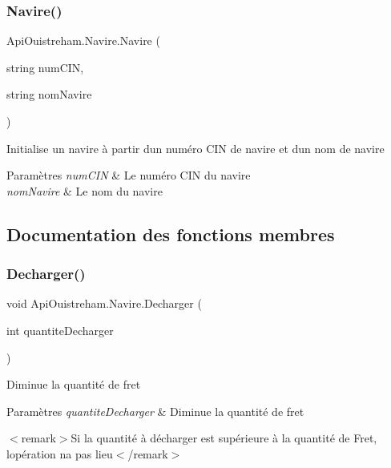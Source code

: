 \subsubsection{\texorpdfstring{Navire()}{Navire()}}
{\footnotesize\ttfamily Api\+Ouistreham.\+Navire.\+Navire (\begin{DoxyParamCaption}\item[{string}]{num\+C\+IN,  }\item[{string}]{nom\+Navire }\end{DoxyParamCaption})}



Initialise un navire à partir d\textquotesingle{}un numéro C\+IN de navire et d\textquotesingle{}un nom de navire 


\begin{DoxyParams}{Paramètres}
{\em num\+C\+IN} & Le numéro C\+IN du navire\\
\hline
{\em nom\+Navire} & Le nom du navire\\
\hline
\end{DoxyParams}


\subsection{Documentation des fonctions membres}
\mbox{\label{class_api_ouistreham_1_1_navire_ab9e8ee30d5c11742d5127c3af6acdba2}} 
\subsubsection{\texorpdfstring{Decharger()}{Decharger()}}
{\footnotesize\ttfamily void Api\+Ouistreham.\+Navire.\+Decharger (\begin{DoxyParamCaption}\item[{int}]{quantite\+Decharger }\end{DoxyParamCaption})}



Diminue la quantité de fret 


\begin{DoxyParams}{Paramètres}
{\em quantite\+Decharger} & Diminue la quantité de fret\\
\hline
\end{DoxyParams}
$<$remark$>$Si la quantité à décharger est supérieure à la quantité de Fret, l\textquotesingle{}opération n\textquotesingle{}a pas lieu$<$/remark$>$ \mbox{\label{class_api_ouistreham_1_1_navire_af985f63194e727c05a19a7493e8cf4b4}} 
